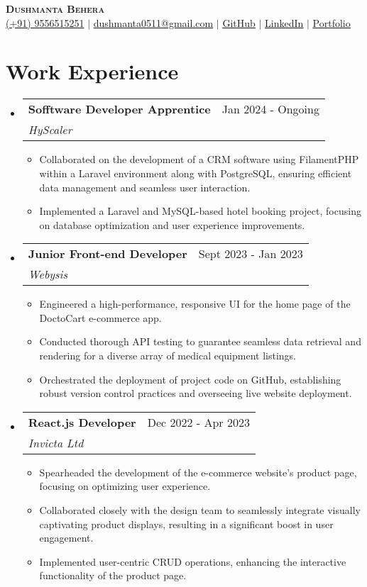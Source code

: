 \documentclass[letterpaper,11pt]{article}
\makeatletter
\newcommand{\resumeItem}[1]{
  \item\small{
    {#1 \vspace{-2pt}}
  }
}
\newcommand{\resumeSubheading}[4]{
  \vspace{-2pt}\item
    \begin{tabular*}{0.97\textwidth}[t]{l@{\extracolsep{\fill}}r}
      \textbf{#1} & #2 \\
      \textit{\small#3} & \textit{\small #4} \\
    \end{tabular*}\vspace{-7pt}
}
\newcommand{\resumeSubHeadingListStart}{\begin{itemize}[leftmargin=0.15in, label={}]}
\newcommand{\resumeSubHeadingListEnd}{\end{itemize}}
\newcommand{\resumeItemListStart}{\begin{itemize}}
\newcommand{\resumeItemListEnd}{\end{itemize}\vspace{-5pt}}
\makeatother
\begin{document}

\begin{center}
   \textbf{\Huge \scshape Dushmanta Behera} \\ \vspace{1pt}
    \small 
    \raisebox{-0.05\height}{\faPhone*} \href{tel:+919556515251}{{(+91) 9556515251}} $|$ 
    \raisebox{-0.05\height}{\faEnvelope} \href{mailto:dushmanta0511@gmail.com}{{dushmanta0511@gmail.com}} $|$ 
    \raisebox{-0.05\height}{\faGithub} \href{https://github.com/dushmanta05}{{\underline{GitHub}}}
     $|$ 
    \raisebox{-0.05\height}{\faLinkedin} \href{https://www.linkedin.com/in/dushmanta05/}{{\underline{LinkedIn}}}
    $|$ 
    \raisebox{-0.05\height}{\faGlobe} \href{https://dushmanta.dev/}{{\underline{Portfolio}}}
    
    
\end{center}


\section{Work Experience}
  \resumeSubHeadingListStart
\resumeSubheading
      {Sofftware Developer Apprentice}{Jan 2024 - Ongoing}
      {HyScaler}{}
      \resumeItemListStart
      \resumeItem{Collaborated on the development of a CRM software using FilamentPHP within a Laravel environment along with PostgreSQL, ensuring efficient data management and seamless user interaction.}
       \resumeItem{Implemented a Laravel and MySQL-based hotel booking project, focusing on database optimization and user experience improvements.}
    \resumeItemListEnd
  \resumeSubheading
      {Junior Front-end Developer}{Sept 2023 - Jan 2023}
      {Webysis}{}
      \resumeItemListStart
       \resumeItem{Engineered a high-performance, responsive UI for the home page of the DoctoCart e-commerce app.}
        \resumeItem{Conducted thorough API testing to guarantee seamless data retrieval and rendering for a diverse array of medical equipment listings.}
         \resumeItem{Orchestrated the deployment of project code on GitHub, establishing robust version control practices and overseeing live website deployment.}
    \resumeItemListEnd
  \resumeSubheading
      {React.js Developer}{Dec 2022 - Apr 2023}
      {Invicta Ltd}{}
      \resumeItemListStart
       \resumeItem{Spearheaded the development of the e-commerce website's product page, focusing on optimizing user experience.}
        \resumeItem{Collaborated closely with the design team to seamlessly integrate visually captivating product displays, resulting in a significant boost in user engagement.}
         \resumeItem{Implemented user-centric CRUD operations, enhancing the interactive functionality of the product page.}
    \resumeItemListEnd
  \resumeSubHeadingListEnd
\end{document}
